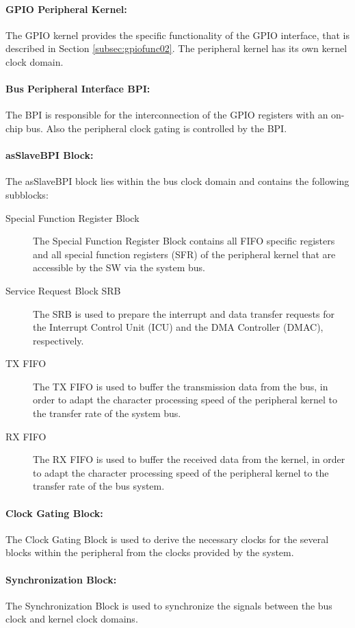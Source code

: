 \paragraph{GPIO Peripheral Kernel: } The GPIO kernel provides the specific functionality of the GPIO interface, that is described in Section \ref{subsec:gpiofunc02}. The peripheral kernel has its own kernel clock domain.

\paragraph{Bus Peripheral Interface BPI: } The BPI is responsible for the interconnection of the GPIO registers with an on-chip bus. Also the peripheral clock gating is controlled by the BPI.

\paragraph{asSlaveBPI Block: } The asSlaveBPI block lies within the bus clock domain and contains the following subblocks:
\begin{description}
  \item [Special Function Register Block] The Special Function Register Block contains all FIFO specific registers and all special function registers (SFR) of the peripheral kernel that are accessible by the SW via the system bus.
  \item [Service Request Block SRB] The SRB is used to prepare the interrupt and data transfer requests for the Interrupt Control Unit (ICU) and the DMA Controller (DMAC), respectively.
  \item [TX FIFO] The TX FIFO is used to buffer the transmission data from the bus, in order to adapt the character processing speed of the peripheral kernel to the transfer rate of the system bus.
  \item [RX FIFO] The RX FIFO is used to buffer the received data from the kernel, in order to adapt the character processing speed of the peripheral kernel to the transfer rate of the bus system.
\end{description}

\paragraph{Clock Gating Block: } The Clock Gating Block is used to derive the necessary clocks for the several blocks within the peripheral from the clocks provided by the system.

\paragraph{Synchronization Block: } The Synchronization Block is used to synchronize the signals between the bus clock and kernel clock domains.
